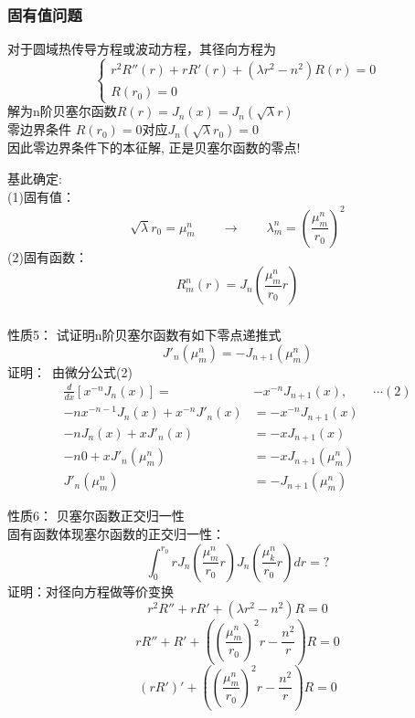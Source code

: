 \begin{frame}
	\frametitle{固有值问题}
	对于圆域热传导方程或波动方程，其径向方程为
	\[\begin{cases}
		r^2 R'' (r)+r R'(r) +( \lambda r^2 -n^2)R(r)=0  \\
		R(r_0)=0
	\end{cases}  \]
	解为n阶贝塞尔函数$R(r)=J_n(x) = J_n(\sqrt{\lambda}r)$ \\ \vspace*{2em}
	{\Bullet} 零边界条件 $R(r_0)=0$对应$J_n(\sqrt{\lambda}r_0)=0$\\ 
	因此零边界条件下的本征解, 正是贝塞尔函数的零点!
\end{frame}	

\begin{frame}
	基此确定:\\	
	(1)固有值：
	\[ \sqrt{\lambda}r_0 = \mu_{m}^{n}  \qquad \to \qquad \lambda_m ^n =(\frac{\mu_{m}^{n}}{r_0})^2 \]
	(2)固有函数：\[R_m ^n(r) = J_n (\frac{\mu_{m}^{n}}{r_0}r) \]
\end{frame}

\begin{frame}
	\frametitle{}
	\alert{性质5：} 试证明n阶贝塞尔函数有如下零点递推式
	\[ J'_n(\mu_m ^n)= - J_{n+1}(\mu_m ^n)\]
	\alert{证明：}~由微分公式(2) 
 	\begin{equation*}
	\begin{split}
	 \frac{d}{d x}\left[x^{-n} J_{n}(x)\right]=& -x^{-n} J_{n+1}(x) ,\qquad \cdots (2) \\
	 -n x^{-n-1} J_n(x) + x^{-n} J'_n(x)&= -x^{-n} J_{n+1}(x) \\
	 -n J_n(x) + x J'_n(x)&= -x J_{n+1}(x) \\
	 -n 0 + x J'_n(\mu_m ^n)&= -x J_{n+1}(\mu_m ^n) \\
	 J'_n(\mu_m ^n)&= - J_{n+1}(\mu_m ^n)
 	\end{split}
	\end{equation*}	
\end{frame}

\begin{frame}
	\alert{性质6：} 贝塞尔函数正交归一性\\
	固有函数体现塞尔函数的正交归一性：
	\begin{equation*}
		\int_0 ^{r_0} r J_n (\frac{\mu_{m} ^{n}}{r_0}r) J_n (\frac{\mu_{k} ^{n}}{r_0}r) dr =?
	\end{equation*}
	\alert{证明：}对径向方程做等价变换
	\begin{equation*}
		r^2 R''+r R' +(\lambda r^2 -n^2)R=0 
	\end{equation*}	
	\begin{equation*}
		r R''+ R' +((\frac{\mu_{m}^{n}}{r_0})^2 r -\frac{n^2}{r})R=0  
	\end{equation*}	
	\begin{equation*}
		(r R')' +((\frac{\mu_{m}^{n}}{r_0})^2 r -\frac{n^2}{r})R=0  
	\end{equation*}	
\end{frame}	


